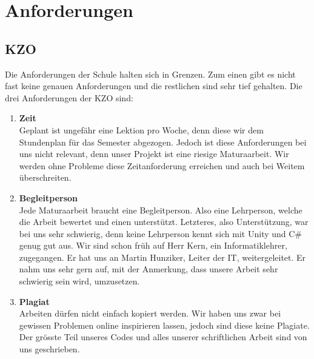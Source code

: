 \chapter{Anforderungen}

\section{KZO}
Die Anforderungen der Schule halten sich in Grenzen. Zum einen gibt es nicht fast keine
genauen Anforderungen und die restlichen sind sehr tief gehalten. Die drei Anforderungen der KZO sind:
\begin{enumerate}
    \item \textbf{Zeit} \\
        Geplant ist ungefähr eine Lektion pro Woche, denn diese wir dem Stundenplan für das Semester abgezogen.
        Jedoch ist diese Anforderungen bei uns nicht relevant, denn unser Projekt ist eine riesige Maturaarbeit.
        Wir werden ohne Probleme diese Zeitanforderung erreichen und auch bei Weitem überschreiten.
    \item \textbf{Begleitperson} \\
        Jede Maturaarbeit braucht eine Begleitperson. Also eine Lehrperson, welche die Arbeit bewertet und einen unterstützt.
        Letzteres, also Unterstützung, war bei uns sehr schwierig, denn keine Lehrperson kennt sich mit Unity und C\# genug gut aus.
        Wir sind schon früh auf Herr Kern, ein Informatiklehrer, zugegangen.
        Er hat uns an Martin Hunziker, Leiter der IT, weitergeleitet. Er nahm uns sehr gern auf, mit der Anmerkung, dass unsere Arbeit sehr schwierig sein wird, umzusetzen.
    \item \textbf{Plagiat} \\
        Arbeiten dürfen nicht einfach kopiert werden. Wir haben uns zwar bei gewissen Problemen online inspirieren lassen, jedoch sind diese keine Plagiate.
        Der grösste Teil unseres Codes und alles unserer schriftlichen Arbeit sind von uns geschrieben.
\end{enumerate}


